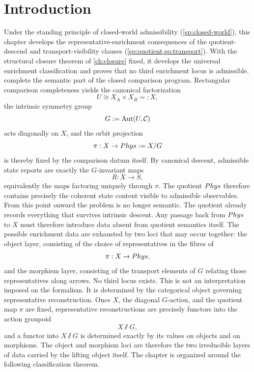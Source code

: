 \section{Introduction}
Under the standing principle of closed-world admissibility
(\cref{sp:closed-world}), this chapter develops the representative-enrichment
consequences of the quotient-descend and transport-visibility clauses
(\cref{sp:quotient,sp:transport}).
With the structural closure theorem of \cref{ch:closure} fixed, it develops
the universal enrichment classification and proves that no third
enrichment locus is admissible.
 complete the semantic part of the closed
comparison program.  Rectangular comparison completeness yields the
canonical factorization
\[
	U\cong X_A\times X_B=:X,
\]
the intrinsic symmetry group
\[
	G:=\operatorname{Aut}(U,\mathcal C)
\]
acts diagonally on \(X\), and the orbit projection
\[
	\pi:X\to Phys:=X/G
\]
is thereby fixed by the comparison datum itself.  By canonical descent,
admissible state reports are exactly the \(G\)-invariant maps
\[
	R:X\to S,
\]
equivalently the maps factoring uniquely through \(\pi\).  The quotient
\(Phys\) therefore contains precisely the coherent state content
visible to admissible observables.
From this point onward the problem is no longer semantic.  The quotient
already records everything that survives intrinsic descent.  Any passage
back from \(Phys\) to \(X\) must therefore introduce data absent from
quotient semantics itself.  The possible enrichment data are exhausted by
two loci that may occur together: the object layer, consisting of the choice of
representatives in the fibres of
\[
	\pi:X\to Phys,
\]
and the morphism layer, consisting of the transport elements of \(G\)
relating those representatives along arrows.  No third locus exists.
This is not an interpretation imposed on the formalism.  It is determined
by the categorical object governing representative reconstruction.
Once \(X\), the diagonal \(G\)-action, and the quotient map \(\pi\) are
fixed, representative reconstructions are precisely functors into the
action groupoid
\[
	X\sslash G,
\]
and a functor into \(X\sslash G\) is determined exactly by its values
on objects and on morphisms.  The object and morphism loci are
therefore the two irreducible layers of data carried by the lifting
object itself.
The chapter is organized around the following classification theorem.
